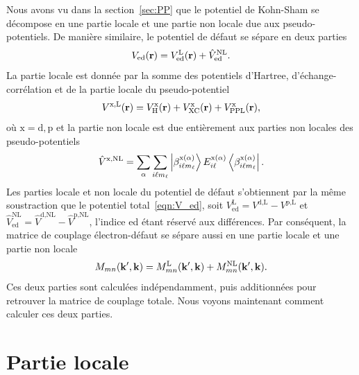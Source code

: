 Nous avons vu dans la section~\ref{sec:PP} que le potentiel de Kohn-Sham se décompose en une partie locale et une partie non locale due aux pseudo-potentiels. De manière similaire, le potentiel de défaut se sépare en deux parties
\begin{equation}
    V_\text{ed}(\mathbf{r}) = V_\text{ed}^\text{L}(\mathbf{r})+\hat{V}_\text{ed}^\text{NL}.
\end{equation}
La partie locale est donnée par la somme des potentiels d'Hartree, d'échange-corrélation et de la partie locale du pseudo-potentiel
\begin{equation}
    V^\text{x,L}(\mathbf{r}) = V_\text{H}^\text{x}(\mathbf{r}) + V_\text{XC}^\text{x}(\mathbf{r})+V_\text{PPL}^\text{x}(\mathbf{r}),
\end{equation}
où $\text{x} = \text{d},\text{p}$ et la partie non locale est due entièrement aux parties non locales des pseudo-potentiels
\begin{equation}
    \hat{V}^\text{x,NL} = \sum_{\alpha}\sum_{i\ell m_\ell}\ket{\beta_{i\ell m_\ell}^{\text{x}(\alpha)}}E_{i\ell}^{\text{x}(\alpha)}\bra{\beta_{i\ell m_\ell}^{\text{x}(\alpha)}}.\label{eqn:V_ed_NL}
\end{equation}
Les parties locale et non locale du potentiel de défaut s'obtiennent par la même soustraction que le potentiel total~\eqref{eqn:V_ed}, soit $V_\text{ed}^\text{L} = V^\text{d,L}-V^\text{p,L}$ et $\hat{V}_\text{ed}^\text{NL} = \hat{V}^\text{d,NL}-\hat{V}^\text{p,NL}$, l'indice \og ed \fg{} étant réservé aux différences. Par conséquent, la matrice de couplage électron-défaut se sépare aussi en une partie locale et une partie non locale
\begin{equation}
    M_{mn}(\mathbf{k}',\mathbf{k}) = M_{mn}^\text{L}(\mathbf{k}',\mathbf{k}) + M_{mn}^\text{NL}(\mathbf{k}',\mathbf{k}).
\end{equation}
Ces deux parties sont calculées indépendamment, puis additionnées pour retrouver la matrice de couplage totale. Nous voyons maintenant comment calculer ces deux parties.

\section{Partie locale}\label{sec:M_local}


